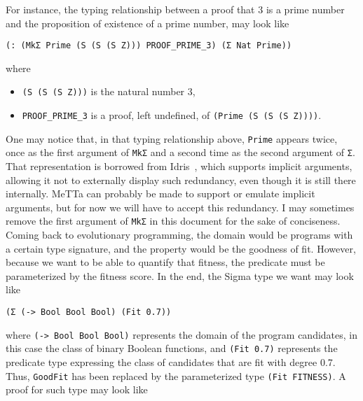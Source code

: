 \documentclass[]{report}
\begin{document}
For instance, the typing relationship between a proof that 3 is a
prime number and the proposition of existence of a prime number, may
look like
\begin{verbatim}
(: (MkΣ Prime (S (S (S Z))) PROOF_PRIME_3) (Σ Nat Prime))
\end{verbatim}
where
\begin{itemize}
\item \texttt{(S (S (S Z)))} is the natural number 3,
\item \texttt{PROOF_PRIME_3} is a proof, left
  undefined, of \texttt{(Prime (S (S (S Z))))}.
\end{itemize}
One may notice that, in that typing relationship above,
\texttt{Prime} appears twice, once as the first argument
of \texttt{MkΣ} and a second time as the second argument
of \texttt{Σ}.  That representation is borrowed from
Idris~\cite{Idris}, which supports implicit arguments, allowing it not
to externally display such redundancy, even though it is still there
internally.  MeTTa can probably be made to support or emulate implicit
arguments, but for now we will have to accept this redundancy.  I may
sometimes remove the first argument of \texttt{MkΣ} in
this document for the sake of conciseness.\\

Coming back to evolutionary programming, the domain would be programs
with a certain type signature, and the property would be the goodness
of fit.  However, because we want to be able to quantify that fitness,
the predicate must be parameterized by the fitness score.  In the end,
the Sigma type we want may look like
\begin{verbatim}
(Σ (-> Bool Bool Bool) (Fit 0.7))
\end{verbatim}
where \texttt{(-> Bool Bool Bool)} represents the domain
of the program candidates, in this case the class of binary Boolean
functions, and \texttt{(Fit 0.7)} represents the predicate
type expressing the class of candidates that are fit with degree 0.7.
Thus, \texttt{GoodFit} has been replaced by the
parameterized type \texttt{(Fit FITNESS)}.  A proof for
such type may look like
\end{document}
